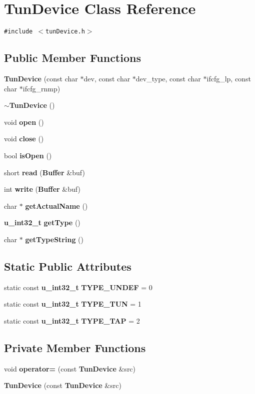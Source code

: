 \section{Tun\-Device Class Reference}
\label{classTunDevice}
{\tt \#include $<$tun\-Device.h$>$}

\subsection*{Public Member Functions}
\begin{CompactItemize}
\item 
{\bf Tun\-Device} (const char $\ast$dev, const char $\ast$dev\_\-type, const char $\ast$ifcfg\_\-lp, const char $\ast$ifcfg\_\-rnmp)
\item 
{\bf $\sim$Tun\-Device} ()
\item 
void {\bf open} ()
\item 
void {\bf close} ()
\item 
bool {\bf is\-Open} ()
\item 
short {\bf read} ({\bf Buffer} \&buf)
\item 
int {\bf write} ({\bf Buffer} \&buf)
\item 
char $\ast$ {\bf get\-Actual\-Name} ()
\item 
{\bf u\_\-int32\_\-t} {\bf get\-Type} ()
\item 
char $\ast$ {\bf get\-Type\-String} ()
\end{CompactItemize}
\subsection*{Static Public Attributes}
\begin{CompactItemize}
\item 
static const {\bf u\_\-int32\_\-t} {\bf TYPE\_\-UNDEF} = 0
\item 
static const {\bf u\_\-int32\_\-t} {\bf TYPE\_\-TUN} = 1
\item 
static const {\bf u\_\-int32\_\-t} {\bf TYPE\_\-TAP} = 2
\end{CompactItemize}
\subsection*{Private Member Functions}
\begin{CompactItemize}
\item 
void {\bf operator=} (const {\bf Tun\-Device} \&src)
\item 
{\bf Tun\-Device} (const {\bf Tun\-Device} \&src)
\end{CompactItemize}
